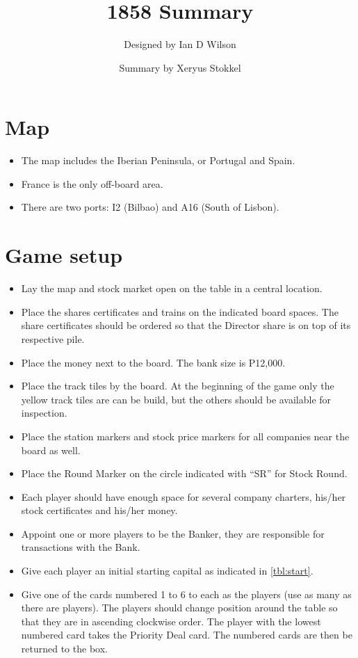 \documentclass[a4paper,twocolumn]{article}
\title{1858 Summary}
\author{Designed by Ian D Wilson}
\date{Summary by Xeryus Stokkel}
\begin{document}
\maketitle

\section{Map}
\begin{itemize}
	\item The map includes the Iberian Peninsula, or Portugal and Spain.
	\item France is the only off-board area.
	\item There are two ports: I2 (Bilbao) and A16 (South of Lisbon).
\end{itemize}

\section{Game setup}
\begin{itemize}
	\item Lay the map and stock market open on the table in a central location.
	\item Place the shares certificates and trains on the indicated board
	spaces. The share certificates should be ordered so that the Director share
	is on top of its respective pile.
	\item Place the money next to the board. The bank size is P12,000.
	\item Place the track tiles by the board. At the beginning of the game only
	the yellow track tiles are can be build, but the others should be available
	for inspection.
	\item Place the station markers and stock price markers for all companies
	near the board as well.
	\item Place the Round Marker on the circle indicated with ``SR'' for Stock
	Round.
	\item Each player should have enough space for several company charters,
	his/her stock certificates and his/her money.
	\item Appoint one or more players to be the Banker, they are responsible for
	transactions with the Bank.
	\item Give each player an initial starting capital as indicated in
	\autoref{tbl:start}.
	\item Give one of the cards numbered 1 to 6 to each as the players (use as
	many as there are players). The players should change position around the
	table so that they are in ascending clockwise order. The player with the
	lowest numbered card takes the Priority Deal card. The numbered cards are
	then be returned to the box.
\end{itemize}
\end{document}
